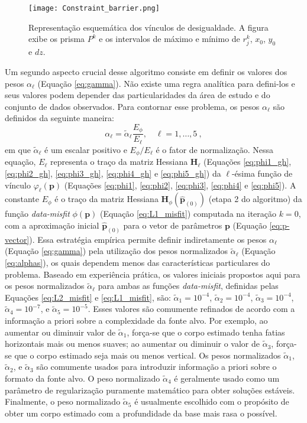 \pagebreak

\begin{figure}[!htb]
	\centering
	\texttt{[image: Constraint\_barrier.png]}
	\caption{Representação esquemática dos vínculos de desigualdade. A figura exibe os prisma $P^k$ e os intervalos de máximo e mínimo de $r^k_j$, $x_0$, $y_0$ e $ dz $.}
	\label{fig:barreira}
\end{figure}

Um segundo aspecto crucial desse algoritmo consiste em definir os valores dos pesos $\alpha_{\ell}$ (Equação \ref{eq:gamma}). 
Não existe uma regra analítica para defini-los e seus valores podem depender das particularidades da área de estudo e do conjunto de dados observados.
Para contornar esse problema, os pesos $\alpha_{\ell}$ são definidos da seguinte maneira:
\begin{equation}\label{eq:alphas}
\alpha_{\ell} = \tilde{\alpha}_{\ell} \frac{E_{\phi}}{E_{\ell}}, 
\quad \ell = 1,\dots, 5 \: ,
\end{equation}
em que $\tilde{\alpha}_{\ell}$ é um escalar positivo e $ E_{\phi}/E_{\ell} $ 
é o fator de normalização.
Nessa equação, $E_{\ell}$ representa o traço da matriz Hessiana $\mathbf{H}_{\ell}$ (Equações \ref{eq:phi1_gh}, \ref{eq:phi2_gh}, \ref{eq:phi3_gh}, \ref{eq:phi4_gh} e \ref{eq:phi5_gh}) da $\ell$-ésima função de vínculo $\varphi_{\ell}(\mathbf{p})$
(Equações \ref{eq:phi1}, \ref{eq:phi2}, \ref{eq:phi3}, \ref{eq:phi4} e \ref{eq:phi5}).
A constante $E_{\phi}$ é o traço da matriz Hessiana
$\mathbf{H}_{\phi}(\hat{\mathbf{p}}_{(0)})$ (etapa 2 do algoritmo) da função \textit{data-misfit} $\phi(\mathbf{p})$ (Equação \ref{eq:L1_misfit}) computada na iteração
$k = 0$, com a aproximação inicial $\hat{\mathbf{p}}_{(0)}$ para o vetor de parâmetros $ \mathbf{p} $ (Equação \ref{eq:p-vector}).
Essa estratégia empírica permite definir indiretamente os pesos $\alpha_{\ell}$ 
(Equação \ref{eq:gamma}) pela utilização dos pesos normalizados $\tilde{\alpha}_{\ell}$ 
(Equação \ref{eq:alphas}), os quais dependem menos das características particulares do problema.
Baseado em experiência prática, os valores iniciais propostos aqui para os pesos normalizados $\tilde{\alpha}_{\ell}$ para ambas as funções \textit{data-misfit}, definidas pelas Equações \ref{eq:L2_misfit} e \ref{eq:L1_misfit}, são:
$\tilde{\alpha}_{1} = 10^{-4}$, $\tilde{\alpha}_{2} = 10^{-4}$, 
$\tilde{\alpha}_{3} = 10^{-4}$, $\tilde{\alpha}_{4} = 10^{-7}$, e 
$\tilde{\alpha}_{5} = 10^{-5}$.
Esses valores são comumente refinados de acordo com a informação a priori sobre a complexidade da fonte alvo. Por exemplo, ao aumentar ou diminuir valor de $\tilde{\alpha}_{1}$, força-se que o corpo estimado tenha fatias horizontais mais ou menos suaves; ao aumentar ou diminuir o valor de $\tilde{\alpha}_{3}$, força-se que o corpo estimado seja mais ou menos vertical. Os pesos normalizados
$\tilde{\alpha}_{1}$, $\tilde{\alpha}_{2}$, e $\tilde{\alpha}_{3}$ são comumente usados para introduzir informação a priori sobre o formato da fonte alvo. O peso normalizado $\tilde{\alpha}_{4}$ é geralmente usado como um parâmetro de regularização puramente matemático para obter soluções estáveis. Finalmente, o peso normalizado $\tilde{\alpha}_{5}$ é usualmente escolhido com o propósito de obter um corpo estimado com a profundidade da base mais rasa o possível.